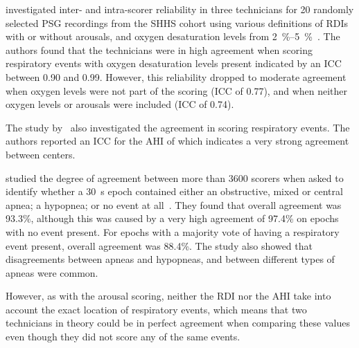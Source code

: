             \citeauthor{Whitney1998} investigated inter- and intra-scorer reliability in three technicians for 20 randomly selected \ac{PSG} recordings from the \ac{SHHS} cohort using various definitions of \acp{RDI} with or without arousals, and oxygen desaturation levels from \SIrange{2}{5}{\percent}~\cite{Whitney1998}.
            The authors found that the technicians were in high agreement when scoring respiratory events with oxygen desaturation levels present indicated by an \ac{ICC} between 0.90 and 0.99.
            However, this reliability dropped to moderate agreement when oxygen levels were not part of the scoring (\ac{ICC} of 0.77), and when neither oxygen levels or arousals were included (\ac{ICC} of 0.74).
            
            The study by~\citeauthor{Magalang2013} also investigated the agreement in scoring respiratory events.
            The authors reported an \ac{ICC} for the \ac{AHI} of  which indicates a very strong agreement between centers.
            
            \citeauthor{Rosenberg2014} studied the degree of agreement between more than \num{3600} scorers when asked to identify whether a \SI{30}{\second} epoch contained either an obstructive, mixed or central apnea; a hypopnea; or no event at all~\cite{Rosenberg2014}.
            They found that overall agreement was 93.3\%, although this was caused by a very high agreement of 97.4\% on epochs with no event present.
            For epochs with a majority vote of having a respiratory event present, overall agreement was 88.4\%.
            The study also showed that disagreements between apneas and hypopneas, and between different types of apneas were common.
            
            However, as with the arousal scoring, neither the \ac{RDI} nor the \ac{AHI} take into account the exact location of respiratory events, which means that two technicians in theory could be in perfect agreement when comparing these values even though they did not score any of the same events.
            
            
            
        

